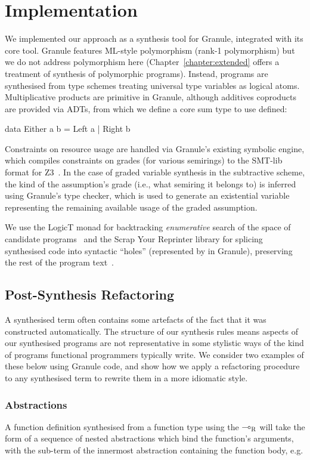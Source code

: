 \section{Implementation}
\label{sec:linear-base-implementation}
We implemented our approach as a synthesis tool for Granule, integrated with its
core tool. Granule features ML-style polymorphism (rank-1 polymorphism) but we
do not address polymorphism here (Chapter~\ref{chapter:extended} offers a treatment of 
synthesis of polymorphic programs). Instead, programs are synthesised from type
schemes treating universal type variables as logical atoms. Multiplicative
products are primitive in Granule, although additives coproducts are provided
via ADTs, from which we define a core sum type to use defined: 
\begin{granule}
  data Either a b = Left a | Right b
\end{granule}
Constraints on resource usage are handled via Granule's existing
symbolic engine, which compiles constraints on grades (for various semirings)
to the SMT-lib format for Z3~\citep{z3}.
In the case of graded variable synthesis in the subtractive
scheme, the kind of the assumption's grade (i.e., what semiring it
belongs to) is inferred using Granule's type
checker, which is used to generate an existential variable representing
the remaining available usage of the graded assumption.

We use the LogicT monad for backtracking \emph{enumerative} search of the 
space of candidate programs~\citep{logict} and the Scrap
Your Reprinter library for splicing synthesised code into syntactic ``holes''
(represented by  in Granule), preserving the rest of the program
text~\citep{clarke2017scrap}.

\subsection{Post-Synthesis Refactoring}
\label{sec:linear-base-refactoring}
A synthesised term often contains some artefacts of the fact that it was
constructed automatically. The structure of our synthesis rules means aspects of
our synthesised programs are not representative in some stylistic ways of the
kind of programs functional programmers typically write. We consider two
examples of these below using Granule code, and show how we apply a refactoring
procedure to any synthesised term to rewrite them in a more idiomatic style. 

\subsubsection{Abstractions}
A function definition synthesised from a function type using the
$\multimap_{\textsc{R}}$ will take the form of a sequence of nested abstractions which
bind the function's arguments, with the sub-term of the innermost abstraction
containing the function body, e.g.

